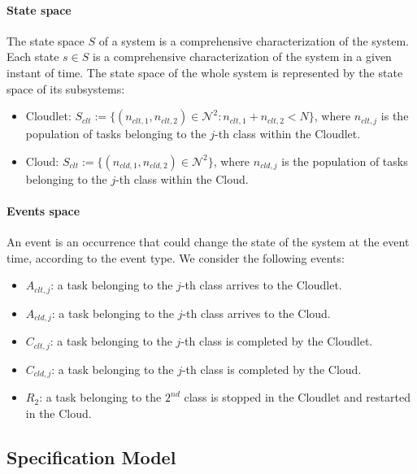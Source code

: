 \paragraph{State space}
The state space $S$ of a system is a comprehensive characterization of the system. Each state $s \in S$ is a comprehensive characterization of the system in a given instant of time.
The state space of the whole system is represented by the state space of its subsystems:

\begin{itemize}
	\item Cloudlet: $S_{clt} := \{(n_{clt,1},n_{clt,2})\in \mathcal{N}^{2}: n_{clt,1}+n_{clt,2}<N\}$, where $n_{clt,j}$ is the population of tasks belonging to the $j$-th class within the Cloudlet.
	
	\item Cloud: $S_{clt} := \{(n_{cld,1},n_{cld,2})\in \mathcal{N}^{2}\}$, where $n_{cld,j}$ is the population of tasks belonging to the $j$-th class within the Cloud.
\end{itemize}

\paragraph{Events space}
An event is an occurrence that could change the state of the system at the event time, according to the event type.
We consider the following events:

\begin{itemize}
	\item $A_{clt,j}$: a task belonging to the $j$-th class arrives to the Cloudlet.
	
	\item $A_{cld,j}$: a task belonging to the $j$-th class arrives to the Cloud.

	\item $C_{clt,j}$: a task belonging to the $j$-th class is completed by the Cloudlet.
	
	\item $C_{cld,j}$: a task belonging to the $j$-th class is completed by the Cloud.
	
	\item $R_{2}$: a task belonging to the $2^{nd}$ class is stopped in the Cloudlet and restarted in the Cloud.
\end{itemize}

\subsection{Specification Model}

